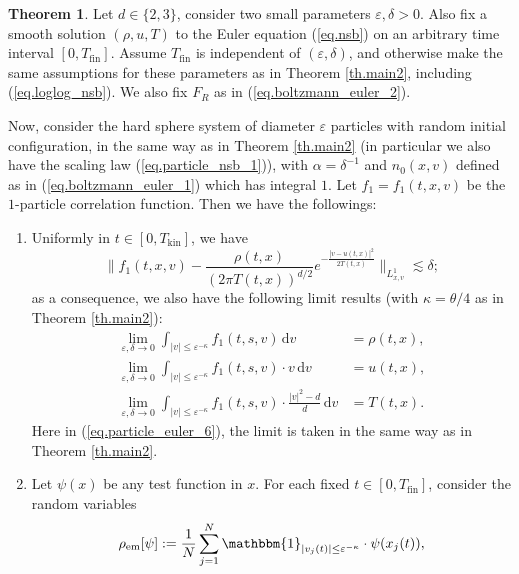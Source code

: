 \documentclass[10pt, reqno]{amsart}
\theoremstyle{definition}
\newtheorem{mainthm}{Theorem}
\theoremstyle{remark}
\numberwithin{equation}{section}
\begin{document}
\begin{mainthm}
\label{th.main3} Let $d\in\{2,3\}$, consider two small parameters $\varepsilon,\delta>0$. Also fix a smooth solution $(\rho,u,T)$ to the Euler equation (\ref{eq.nsb}) on an arbitrary time interval $[0,T_{\mathrm{fin}}]$. Assume $T_{\mathrm{fin}}$ is independent of $(\varepsilon,\delta)$, and otherwise make the same assumptions for these parameters as in Theorem \ref{th.main2}, including (\ref{eq.loglog_nsb}). We also fix $F_R$ as in (\ref{eq.boltzmann_euler_2}).

Now, consider the hard sphere system of diameter $\varepsilon$ particles with random initial configuration, in the same way as in Theorem \ref{th.main2} (in particular we also have the scaling law (\ref{eq.particle_nsb_1})), with $\alpha=\delta^{-1}$ and $n_0(x,v)$ defined as in (\ref{eq.boltzmann_euler_1}) which has integral $1$. Let $f_1=f_1(t,x,v)$ be the $1$-particle correlation function. Then we have the followings:
\begin{enumerate}
\item Uniformly in $t\in[0,T_{\mathrm{kin}}]$, we have
\begin{equation}\label{eq.boltzmann_euler_5}\bigg\|f_1(t,x,v)-\frac{\rho(t,x)}{(2\pi T(t,x))^{d/2}}e^{-\frac{|v-u(t,x)|^2}{2T(t,x)}}\bigg\|_{L_{x,v}^1}\lesssim\delta;
\end{equation}
as a consequence, we also have the following limit results (with $\kappa=\theta/4$ as in Theorem \ref{th.main2}): 
\begin{equation}\label{eq.particle_euler_6}
\begin{aligned}\lim_{\varepsilon,\delta\to 0}\int_{|v|\leq \varepsilon^{-\kappa}}f_1(t,s,v)\,\mathrm{d}v&=\rho(t,x),\\
\lim_{\varepsilon,\delta\to 0}\int_{|v|\leq \varepsilon^{-\kappa}}f_1(t,s,v)\cdot v\,\mathrm{d}v&=u(t,x),\\
\lim_{\varepsilon,\delta\to 0}\int_{|v|\leq \varepsilon^{-\kappa}}f_1(t,s,v)\cdot\frac{|v|^2-d}{d}\,\mathrm{d}v&=T(t,x).
\end{aligned}
\end{equation} Here in (\ref{eq.particle_euler_6}), the limit is taken in the same way as in Theorem \ref{th.main2}.
\item Let $\psi(x)$ be any test function in $x$. For each fixed $t\in[0,T_{\mathrm{fin}}]$, consider the random variables
\begin{equation}\label{eq.empirical_3}
\begin{aligned}
\rho_{\mathrm{em}}[\psi]&:=\frac{1}{N}\sum_{j=1}^N \mathbbm{1}_{|v_j(t)|\leq \varepsilon^{-\kappa}}\cdot\psi(x_j(t)),\\

\end{aligned}
\end{equation}
\end{enumerate}
\end{mainthm}
\end{document}
